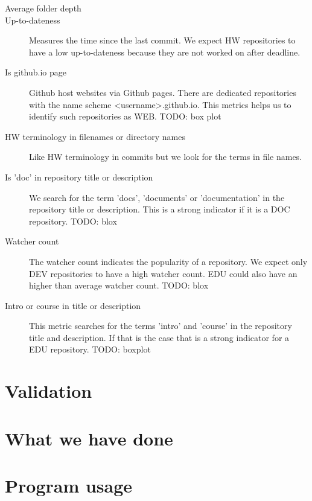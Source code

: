 \documentclass[a4paper]{scrartcl}
\begin{document}
\begin{description}
	\item[Average folder depth]
	\item[Up-to-dateness]
	Measures the time since the last commit. We expect HW repositories to have a low up-to-dateness because they are not worked on after deadline.
	\item[Is github.io page]
	Github host websites via Github pages. There are dedicated repositories with the name scheme <username>.github.io. This metrics helps us to identify such repositories as WEB.
	TODO: box plot
	\item[HW terminology in filenames or directory names]
	Like HW terminology in commits but we look for the terms in file names.
	
	\item[Is 'doc' in repository title or description]
	We search for the term 'docs', 'documents' or 'documentation' in the repository title or description. This is a strong indicator if it is a DOC repository.
	TODO: blox
	\item[Watcher count]
	The watcher count indicates the popularity of a repository. We expect only DEV repositories to have a high watcher count. EDU could also have an higher than average watcher count.
	TODO: blox
	\item[Intro or course in title or description]
	This metric searches for the terms 'intro' and 'course' in the repository title and description. If that is the case that is a strong indicator for a EDU repository.
	TODO: boxplot
	
\end{description}
	

\section{Validation}


\section{What we have done}


\section{Program usage}
\end{document}
